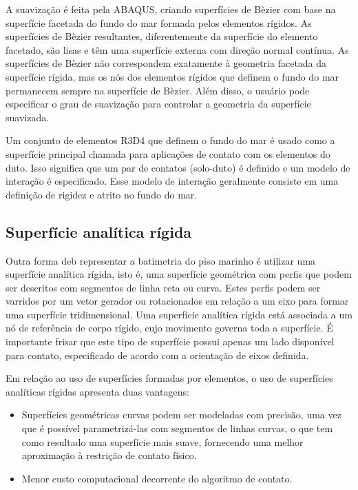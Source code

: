 A suavização é feita pela ABAQUS, criando superfícies de Bèzier com base na superfície facetada do fundo do mar formada pelos elementos rígidos. As superfícies de Bèzier resultantes, diferentemente da superfície do elemento facetado, são lisas e têm uma superfície externa com direção normal contínua. As superfícies de Bèzier não correspondem exatamente à geometria facetada da superfície rígida, mas os nós dos elementos rígidos que definem o fundo do mar permanecem sempre na superfície de Bèzier. Além disso, o usuário pode especificar o grau de suavização para controlar a geometria da superfície suavizada.

Um conjunto de elementos R3D4 que definem o fundo do mar é usado como a superfície principal chamada para aplicações de contato com os elementos do duto. Isso significa que um par de contatos (solo-duto) é definido e um modelo de interação é especificado. Esse modelo de interação geralmente consiste em uma definição de rigidez e atrito no fundo do mar.


\subsection{Superfície analítica rígida}

Outra forma deb representar a batimetria do piso marinho é utilizar uma superfície analítica rígida, isto é, uma superfície geométrica com perfis que podem ser descritos com segmentos de linha reta ou curva. Estes perfis podem ser varridos por um vetor gerador ou rotacionados em relação a um eixo para formar uma superfície tridimensional. Uma superfície analítica rígida está associada a um nó de referência de corpo rígido, cujo movimento governa toda a superfície. É importante frisar que este tipo de superfície possui apenas um lado disponível para contato, especificado de acordo com a orientação de eixos definida.

Em relação ao uso de superfícies formadas por elementos, o uso de superfícies analíticas rígidas apresenta duas vantagens:
\begin{itemize}
    \item Superfícies geométricas curvas podem ser modeladas com precisão, uma vez que é possível parametrizá-las com segmentos de linhas curvas, o que tem como resultado uma superfície mais suave, fornecendo uma melhor aproximação à restrição de contato físico.
    \item Menor custo computacional decorrente do algoritmo de contato.
\end{itemize}

